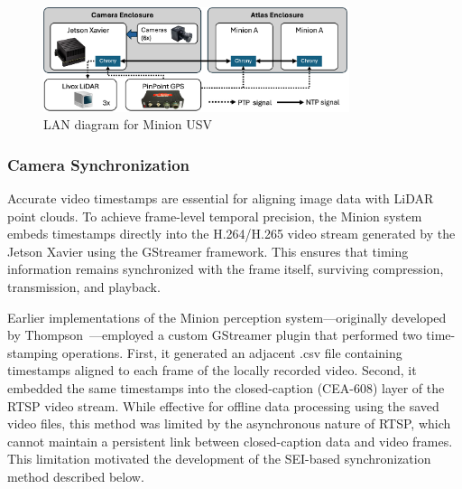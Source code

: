 \documentclass[../main.tex]{subfiles}
\begin{document}
\begin{figure}[htbp]
\centering
\includegraphics[width=0.8\textwidth]{Images/NTP.png}
\caption{LAN diagram for Minion USV}
\label{fig:network_sync}
\end{figure}

\subsubsection{Camera Synchronization} \label{time_sync_cam}

Accurate video timestamps are essential for aligning image data with LiDAR point clouds. To achieve frame-level temporal precision, the Minion system embeds timestamps directly into the H.264/H.265 video stream generated by the Jetson Xavier using the GStreamer framework. This ensures that timing information remains synchronized with the frame itself, surviving compression, transmission, and playback.

Earlier implementations of the Minion perception system—originally developed by Thompson~\cite{thompson2023}—employed a custom GStreamer plugin that performed two time-stamping operations. 
First, it generated an adjacent .csv file containing timestamps aligned to each frame of the locally recorded video. 
Second, it embedded the same timestamps into the closed-caption (CEA-608) layer of the \ac{RTSP} video stream. 
While effective for offline data processing using the saved video files, this method was limited by the asynchronous nature of \ac{RTSP}, which cannot maintain a persistent link between closed-caption data and video frames. 
This limitation motivated the development of the \ac{SEI}-based synchronization method described below.
\end{document}
